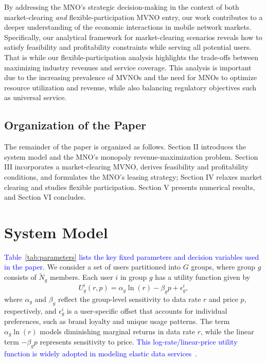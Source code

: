 \documentclass[12pt, draftclsnofoot, onecolumn]{IEEEtran}
\begin{document}
	
	By addressing the MNO's strategic decision-making in the context of both market-clearing \emph{and} flexible-participation MVNO entry, our work contributes to a deeper understanding of the economic interactions in mobile network markets. Specifically, our analytical framework for market-clearing scenarios reveals how to satisfy feasibility and profitability constraints while serving all potential users. That is while our flexible-participation analysis highlights the trade-offs between maximizing industry revenues and service coverage. 
	This analysis is important due to the increasing prevalence of MVNOs and the need for MNOs to optimize resource utilization and revenue, while also balancing regulatory objectives such as universal service.
	\vspace{-.4cm}
	
	\subsection{Organization of the Paper}
	The remainder of the paper is organized as follows.
	Section II introduces the system model and the MNO’s monopoly revenue‑maximization problem. Section III incorporates a market‑clearing MVNO, derives feasibility and profitability conditions, and formulates the MNO’s leasing strategy; Section IV relaxes market clearing and studies flexible participation. Section V presents numerical results, and Section VI concludes.
	
	

	
	
	
	
	\section{System Model} \label{SectionII}
	\textcolor{blue}{Table~\ref{tab:parameters} lists the key fixed parameters and decision variables used in the paper.}
	We consider a set of users partitioned into \(G\) groups, where group \(g\) consists of \(\tilde{N}_g\) members. Each user \(i\) in group \(g\) has a utility function given by 
	\begin{equation}\label{micro_equation}
		U_{g}^i(r, p) = \alpha_g \ln(r) - \beta_g p + \epsilon_{g}^i,
	\end{equation}
	where \(\alpha_g\) and \(\beta_g\) reflect the group-level sensitivity to data rate \(r\) and price \(p\), respectively, and \(\epsilon_{g}^i\) is a user-specific offset that accounts for individual preferences, such as brand loyalty and unique usage patterns. The term \(\alpha_g \ln(r)\) models diminishing marginal returns in data rate \(r\), while the linear term \(-\beta_g p\) represents sensitivity to price. \textcolor{blue}{This log‑rate/linear‑price utility function is widely adopted in modeling elastic data services~\cite{Kelly98,Chiang07,Johari2004}.}
	
\end{document}
